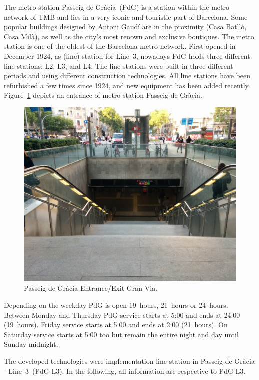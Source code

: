 The metro station Passeig de Gr\`{a}cia~(PdG) is a station within the metro network of TMB and lies in a very iconic and touristic part of Barcelona. Some popular buildings designed by Antoni Gaud\'{i} are in the proximity (Casa Batll\`{o}, Casa Mil\`{a}), as well as the city's most renown and exclusive boutiques.
The metro station is one of the oldest of the Barcelona metro network. First opened in December 1924, as (line) station for Line~3, nowadays PdG holds three different line stations: L2, L3, and L4. The line stations were built in three different periods and using different construction technologies. All line stations have been refurbished a few times since 1924, and new equipment has been added recently. Figure~\ref{fig:PdG_entranceExit} depicts an entrance of metro station Passeig de Gr\`{a}cia.

\begin{figure}[htbp]
  \centering
  \includegraphics[width=\linewidth]{Figures/PdG-L3_entranceExit.jpg} 
  \caption{Passeig de Gr\`{a}cia Entrance/Exit Gran Via. \cite{TMB_2014}}
  \label{fig:PdG_entranceExit}
\end{figure}

Depending on the weekday PdG is open 19~hours, 21~hours or 24~hours. Between Monday and Thursday PdG service starts at 5:00 and ends at 24:00 (19~hours). Friday service starts at 5:00 and ends at 2:00 (21~hours). On Saturday service starts at 5:00 too but remain the entire night and day until Sunday midnight.

The developed technologies were implementation line station in Passeig de Gr\`{a}cia - Line~3~(PdG-L3). In the following, all information are respective to PdG-L3.

